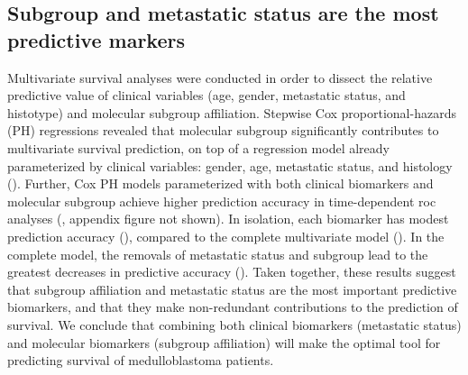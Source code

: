 \clearpage

\subsection{Subgroup and metastatic status are the most predictive markers}

Multivariate survival analyses were conducted in order to dissect the relative predictive value of clinical variables (age, gender, metastatic status, and histotype) and molecular subgroup affiliation. Stepwise Cox proportional-hazards (PH) regressions revealed that molecular subgroup significantly contributes to multivariate survival prediction, on top of a regression model already parameterized by clinical variables: gender, age, metastatic status, and histology (). Further, Cox PH models parameterized with both clinical biomarkers and molecular subgroup achieve higher prediction accuracy in time-dependent \gls{roc} analyses (, appendix figure not shown). In isolation, each biomarker has modest prediction accuracy (), compared to the complete multivariate model (). In the complete model, the removals of metastatic status and subgroup lead to the greatest decreases in predictive accuracy (). Taken together, these results suggest that subgroup affiliation and metastatic status are the most important predictive biomarkers, and that they make non-redundant contributions to the prediction of survival. We conclude that combining both clinical biomarkers (metastatic status) and molecular biomarkers (subgroup affiliation) will make the optimal tool for predicting survival of medulloblastoma patients.

